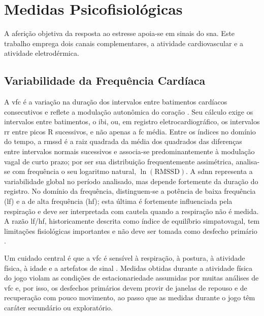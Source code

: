 \section{Medidas Psicofisiológicas}\label{sec:fund-psicofisiologia}

A aferição objetiva da resposta ao estresse apoia-se em sinais do \gls{sna}. Este trabalho emprega dois canais complementares, a atividade cardiovascular e a atividade eletrodérmica.

\subsection{Variabilidade da Frequência Cardíaca}\label{subsec:fund-vfc}

A \gls{vfc} é a variação na duração dos intervalos entre batimentos cardíacos consecutivos e reflete a modulação autonômica do coração \citep{TaskForce1996}. Seu cálculo exige os intervalos entre batimentos, o \gls{ibi}, ou, em registro eletrocardiográfico, os intervalos \gls{rr} entre picos R sucessivos, e não apenas a \gls{fc} média. Entre os índices no domínio do tempo, a \gls{rmssd} é a raiz quadrada da média dos quadrados das diferenças entre intervalos normais sucessivos e associa-se predominantemente à modulação vagal de curto prazo; por ser sua distribuição frequentemente assimétrica, analisa-se com frequência o seu logaritmo natural, $\ln(\mathrm{RMSSD})$. A \gls{sdnn} representa a variabilidade global no período analisado, mas depende fortemente da duração do registro. No domínio da frequência, distinguem-se a potência de baixa frequência (\gls{lf}) e a de alta frequência (\gls{hf}); esta última é fortemente influenciada pela respiração e deve ser interpretada com cautela quando a respiração não é medida. A razão \gls{lf}/\gls{hf}, historicamente descrita como índice de equilíbrio simpatovagal, tem limitações fisiológicas importantes e não deve ser tomada como desfecho primário \citep{Billman2013}.

Um cuidado central é que a \gls{vfc} é sensível à respiração, à postura, à atividade física, à idade e a artefatos de sinal \citep{TaskForce1996}. Medidas obtidas durante a atividade física do jogo violam as condições de estacionariedade assumidas por muitas análises de \gls{vfc} e, por isso, os desfechos primários devem provir de janelas de repouso e de recuperação com pouco movimento, ao passo que as medidas durante o jogo têm caráter secundário ou exploratório.

